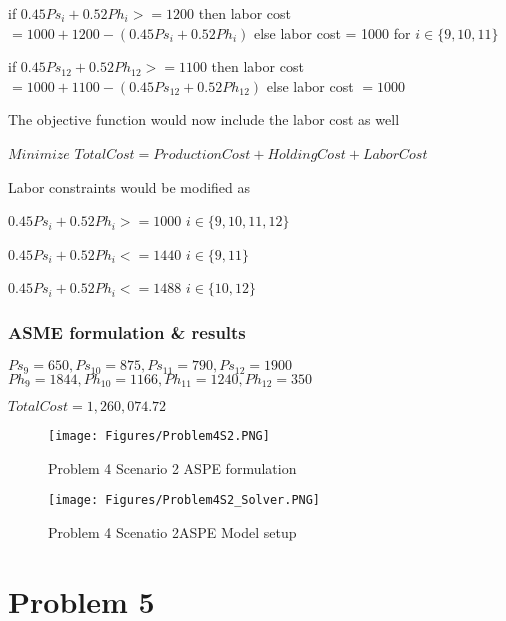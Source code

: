 \documentclass[]{article}
\begin{document}
if \(0.45Ps_{i} + 0.52Ph_{i} >= 1200\) then labor cost
\(= 1000 + 1200 - (0.45Ps_{i} + 0.52Ph_{i})\) else labor cost = 1000 for
\(i \in \{9,10,11\}\)

if \(0.45Ps_{12} + 0.52Ph_{12} >= 1100\) then labor cost
\(= 1000 + 1100 - (0.45Ps_{12} + 0.52Ph_{12})\) else labor cost
\(= 1000\)

The objective function would now include the labor cost as well

\(Minimize\)
\(Total Cost = Production Cost + Holding Cost + Labor Cost\)

Labor constraints would be modified as

\(0.45Ps_{i} + 0.52Ph_{i} >= 1000\) \(i \in \{9,10,11,12\}\)

\(0.45Ps_{i} + 0.52Ph_{i} <= 1440\) \(i \in \{9,11\}\)

\(0.45Ps_{i} + 0.52Ph_{i} <= 1488\) \(i \in \{10,12\}\)

\subsubsection{ASME formulation \&
results}\label{asme-formulation-results-1}

\(Ps_{9} = 650, Ps_{10} = 875, Ps_{11} = 790, Ps_{12} = 1900\)
\(Ph_{9} = 1844, Ph_{10} = 1166, Ph_{11} = 1240, Ph_{12} = 350\)

\(Total Cost = 1,260,074.72\)

\begin{figure}
\centering
\texttt{[image: Figures/Problem4S2.PNG]}
\caption{Problem 4 Scenario 2 ASPE formulation}
\end{figure}

\begin{figure}
\centering
\texttt{[image: Figures/Problem4S2\_Solver.PNG]}
\caption{Problem 4 Scenatio 2ASPE Model setup}
\end{figure}

\pagebreak

\section{Problem 5}\label{problem-5}
\end{document}
